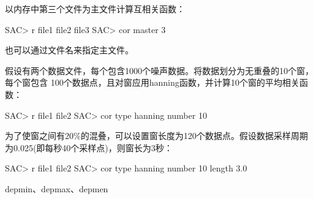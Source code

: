 以内存中第三个文件为主文件计算互相关函数：
\begin{SACCode}
SAC> r file1 file2 file3
SAC> cor master 3
\end{SACCode}
也可以通过文件名来指定主文件。

假设有两个数据文件，每个包含1000个噪声数据。将数据划分为无重叠的10个窗，每个窗包含
100个数据点，且对窗应用hanning函数，并计算10个窗的平均相关函数：
\begin{SACCode}
SAC> r file1 file2
SAC> cor type hanning number 10
\end{SACCode}

为了使窗之间有20\%的混叠，可以设置窗长度为120个数据点。假设数据采样周期为0.025(即每秒40个采样点)，则窗长为3秒：
\begin{SACCode}
SAC> r file1 file2
SAC> cor type hanning number 10 length 3.0
\end{SACCode}

depmin、depmax、depmen

